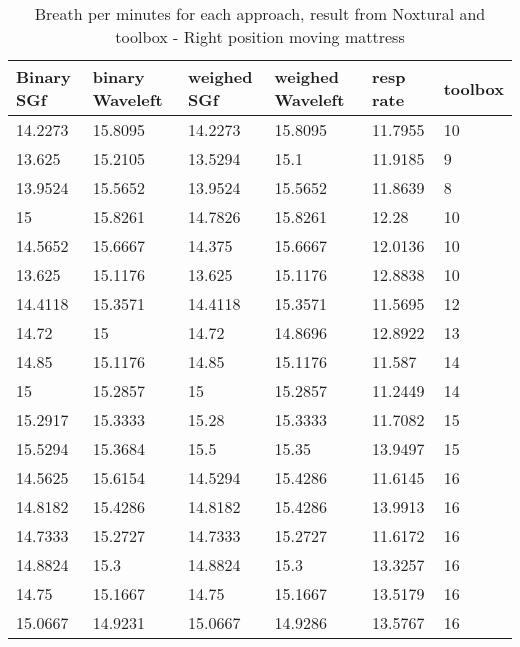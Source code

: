 \begin{table}\begin{tabular}{|llllll|}
\hline 
Binary SGf & binary Waveleft & weighed  SGf & weighed Waveleft & resp rate & toolbox \\ 
\hline 
14.2273 & 15.8095 & 14.2273 & 15.8095 & 11.7955 & 10 \\ 
13.625 & 15.2105 & 13.5294 & 15.1 & 11.9185 & 9 \\ 
13.9524 & 15.5652 & 13.9524 & 15.5652 & 11.8639 & 8 \\ 
15 & 15.8261 & 14.7826 & 15.8261 & 12.28 & 10 \\ 
14.5652 & 15.6667 & 14.375 & 15.6667 & 12.0136 & 10 \\ 
13.625 & 15.1176 & 13.625 & 15.1176 & 12.8838 & 10 \\ 
14.4118 & 15.3571 & 14.4118 & 15.3571 & 11.5695 & 12 \\ 
14.72 & 15 & 14.72 & 14.8696 & 12.8922 & 13 \\ 
14.85 & 15.1176 & 14.85 & 15.1176 & 11.587 & 14 \\ 
15 & 15.2857 & 15 & 15.2857 & 11.2449 & 14 \\ 
15.2917 & 15.3333 & 15.28 & 15.3333 & 11.7082 & 15 \\ 
15.5294 & 15.3684 & 15.5 & 15.35 & 13.9497 & 15 \\ 
14.5625 & 15.6154 & 14.5294 & 15.4286 & 11.6145 & 16 \\ 
14.8182 & 15.4286 & 14.8182 & 15.4286 & 13.9913 & 16 \\ 
14.7333 & 15.2727 & 14.7333 & 15.2727 & 11.6172 & 16 \\ 
14.8824 & 15.3 & 14.8824 & 15.3 & 13.3257 & 16 \\ 
14.75 & 15.1667 & 14.75 & 15.1667 & 13.5179 & 16 \\ 
15.0667 & 14.9231 & 15.0667 & 14.9286 & 13.5767 & 16 \\ 
\hline 
\end{tabular}
\caption{Breath per minutes for each approach, result from Noxtural and toolbox
- Right position moving mattress}
\end{table}
